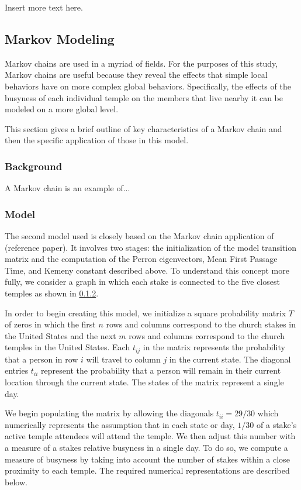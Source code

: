 \documentclass[twoside,twocolumn]{article}
\begin{document}
Insert more text here.


\subsection{Markov Modeling}

Markov chains are used in a myriad of fields. For the purposes of this study, Markov chains are useful because they reveal the effects that simple local behaviors have on more complex global behaviors. Specifically, the effects of the busyness of each individual temple on the members that live nearby it can be modeled on a more global level.

This section gives a brief outline of key characteristics of a Markov chain and then the specific application of those in this model.

\subsubsection{Background}

A Markov chain is an example of...

\subsubsection{Model}
The second model used is closely based on the Markov chain application of (reference paper). It involves two stages: the initialization of the model transition matrix and the computation of the Perron eigenvectors, Mean First Passage Time, and Kemeny constant described above. To understand this concept more fully, we consider a graph in which each stake is connected to the five closest temples as shown in \ref{}.

In order to begin creating this model, we initialize a square probability matrix $T$ of zeros in which the first $n$ rows and columns correspond to the church stakes in the United States and the next $m$ rows and columns correspond to the church temples in the United States. Each $t_{ij}$ in the matrix represents the probability that a person in row $i$ will travel to column $j$ in the current state. The diagonal entries $t_{ii}$ represent the probability that a person will remain in their current location through the current state. The states of the matrix represent a single day.

We begin populating the matrix by allowing the diagonals $t_{ii} = 29/30$ which numerically represents the assumption that in each state or day, $1/30$ of a stake's active temple attendees will attend the temple. We then adjust this number with a measure of a stakes relative busyness in a single day. To do so, we compute a measure of busyness by taking into account the number of stakes within a close proximity to each temple. The required numerical representations are described below.
\end{document}
